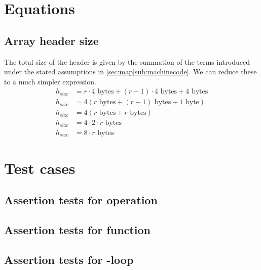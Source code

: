 %
%
%


\appendix
\label{ch:appendix}

\section{Equations}
\label{ch:appendix|sec:equations}

\subsection{Array header size}
\label{ch:appendix|sec:equations|sub:array-head-size}
The total size of the header is given by the summation of the terms introduced
under the stated assumptions in \ref{sec:map|sub:machinecode}. We can reduce
these to a much simpler expression.
\begin{align}
	h_{size} &= r \cdot 4 \text{ bytes} +
	(r - 1) \cdot 4 \text{ bytes} +
	4 \text{ bytes} \\
	h_{size} &= 4 (r \text{ bytes} +
	(r - 1) \text{ bytes} +
	1 \text{ byte}) \\
	h_{size} &= 4 (r \text{ bytes} +
	r \text{ bytes}) \\
	h_{size} &= 4 \cdot 2 \cdot r \text{ bytes} \\
	h_{size} &= 8 \cdot r \text{ bytes}
\end{align}


\newpage
\section{Test cases}
\label{ch:appendix|sec:testcases}

\subsection{Assertion tests for  operation}
\label{ch:appendix|sec:testcases|sub:and-assert}


\subsection{Assertion tests for  function}
\label{ch:appendix|sec:testcases|sub:map-assert}


\subsection{Assertion tests for -loop}
\label{ch:appendix|sec:testcases|sub:for-assert}



